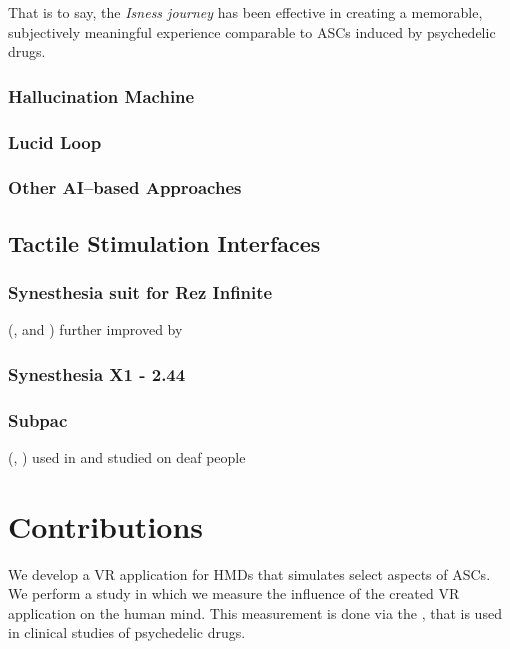 That is to say, the \textit{Isness journey} has been effective in creating a memorable, subjectively meaningful experience comparable to \acp{ASC} induced by psychedelic drugs.

\subsubsection{Hallucination Machine}
\autocite{suzuki2018hallucination}

\subsubsection{Lucid Loop}
\autocite{kitson2019lucid}

\subsubsection{Other AI--based Approaches}
\autocite{schartner2020neural}

\subsection{Tactile Stimulation Interfaces}\label{sec:tactile_stimulation_interfaces}

\subsubsection{Synesthesia suit for Rez Infinite}\label{sec:synesthesia_suit}
(\textcite{konishi2016synesthesia1}, \textcite{konishi2016synesthesia2} and \textcite{synesthesia2016suit})
further improved by \autocite{furukawa2019synesthesia}
\textcite{outram2017crystal}

\subsubsection{Synesthesia X1 - 2.44}
\autocite{synesthesia2021x1}

\subsubsection{Subpac}
(\textcite{subpac2013subpac}, \textcite{drempetic2017wearable})
used in \autocite{zimmermann2016longing}
and studied on deaf people \autocite{schmitz2020hearing}


\section{Contributions}
We develop a \ac{VR} application for \acp{HMD} that simulates select aspects of \acp{ASC}.
We perform a study in which we measure the influence of the created \ac{VR} application on the human mind. This measurement is done via the , that is used in clinical studies of psychedelic drugs.

